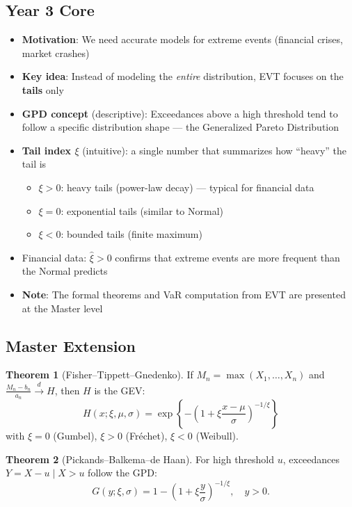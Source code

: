 \documentclass[11pt, a4paper]{article}
\theoremstyle{definition}
\newtheorem{thm}{Theorem}
\begin{document}
\subsection{Year 3 Core}
\begin{itemize}
  \item \textbf{Motivation}: We need accurate models for extreme events (financial crises, market crashes)
  \item \textbf{Key idea}: Instead of modeling the \textit{entire} distribution, EVT focuses on the \textbf{tails} only
  \item \textbf{GPD concept} (descriptive): Exceedances above a high threshold tend to follow a specific distribution shape — the Generalized Pareto Distribution
  \item \textbf{Tail index $\xi$} (intuitive): a single number that summarizes how ``heavy'' the tail is
  \begin{itemize}
    \item $\xi > 0$: heavy tails (power-law decay) — typical for financial data
    \item $\xi = 0$: exponential tails (similar to Normal)
    \item $\xi < 0$: bounded tails (finite maximum)
  \end{itemize}
  \item Financial data: $\hat{\xi} > 0$ confirms that extreme events are more frequent than the Normal predicts
  \item \textbf{Note}: The formal theorems and VaR computation from EVT are presented at the Master level
\end{itemize}

\subsection{Master Extension}

\begin{thm}[Fisher--Tippett--Gnedenko]
If $M_n = \max(X_1, \ldots, X_n)$ and $\frac{M_n - b_n}{a_n} \xrightarrow{d} H$, then $H$ is the GEV:
\[
  H(x;\xi,\mu,\sigma) = \exp\!\left\{-\left(1 + \xi\frac{x-\mu}{\sigma}\right)^{-1/\xi}\right\}
\]
with $\xi = 0$ (Gumbel), $\xi > 0$ (Fréchet), $\xi < 0$ (Weibull).
\end{thm}

\begin{thm}[Pickands--Balkema--de Haan]
For high threshold $u$, exceedances $Y = X - u \mid X > u$ follow the GPD:
\[
  G(y;\xi,\sigma) = 1 - \left(1 + \xi\frac{y}{\sigma}\right)^{-1/\xi}, \quad y > 0.
\]
\end{thm}
\end{document}
